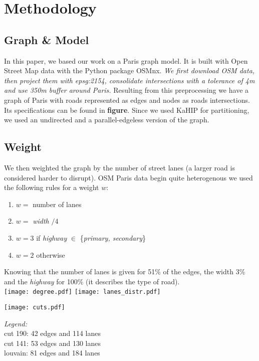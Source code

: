 \section{Methodology}
\label{sec:methodology}

\subsection*{Graph \& Model}
In this paper, we based our work on a Paris graph model. It is built with Open Street Map data with the Python package OSMnx. \textit{We first download OSM data, then project them with epsg:2154, consolidate intersections with a tolerance of 4m and use  350m buffer around Paris.} Resulting from this preprocessing we have a graph of Paris with roads represented as edges and nodes as roads intersections. Its specifications can be found in \textbf{figure}. Since we used KaHIP for partitioning, we used an undirected and a parallel-edgeless version of the graph.

\subsection*{Weight}
We then weighted the graph by the number of street lanes (a larger road is considered harder to disrupt). OSM Paris data begin quite heterogenous we used the following rules for a weight $w$:
\begin{enumerate}
    \item $w =$ number of lanes
    \item $w =$ \textit{width} $/ 4$
    \item $w = 3$ if \textit{highway} $\in$ \{\textit{primary, secondary}\} \item $w = 2$ otherwise
\end{enumerate}
Knowing that the number of lanes is given for 51\% of the edges, the width 3\% and the \textit{highway} for 100\% (it describes the type of road).\\

\texttt{[image: degree.pdf]}
\texttt{[image: lanes\_distr.pdf]}


\begin{multicols}{2}
    \texttt{[image: cuts.pdf]}
    \begin{boxB}
        \begin{center}
            \emph{Legend:}\\
            \color{red} cut 190: 42 edges and 114 lanes\\
            \color{violet} cut 141: 53 edges and 130 lanes\\
            \color{orange} louvain: 81 edges and 184 lanes
        \end{center}
    \end{boxB}
\end{multicols}